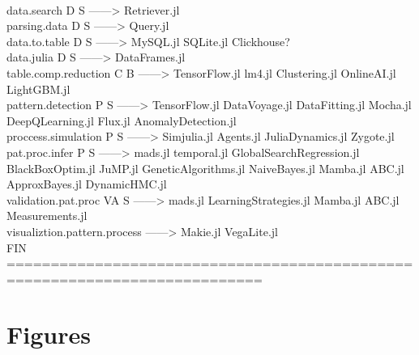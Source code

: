 \documentclass[english,12pt]{article}
\begin{document}
 \\
data.search D S                ------> Retriever.jl \\
parsing.data D S               ------> Query.jl  \\
data.to.table D S              ------> MySQL.jl SQLite.jl Clickhouse? \\
data.julia D S                 ------> DataFrames.jl \\
table.comp.reduction C B       ------> TensorFlow.jl lm4.jl Clustering.jl OnlineAI.jl LightGBM.jl \\
pattern.detection P S          ------> TensorFlow.jl DataVoyage.jl DataFitting.jl Mocha.jl DeepQLearning.jl Flux.jl AnomalyDetection.jl \\
proccess.simulation P S        ------> Simjulia.jl Agents.jl JuliaDynamics.jl Zygote.jl \\
pat.proc.infer P S             ------> mads.jl temporal.jl GlobalSearchRegression.jl BlackBoxOptim.jl JuMP.jl GeneticAlgorithms.jl NaiveBayes.jl Mamba.jl ABC.jl ApproxBayes.jl DynamicHMC.jl \\
validation.pat.proc VA S       ------> mads.jl LearningStrategies.jl Mamba.jl ABC.jl Measurements.jl \\
visualiztion.pattern.process   ------> Makie.jl VegaLite.jl \\
FIN ===========================================================================


\newpage

\section{Figures}
\end{document}
